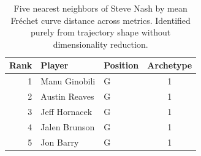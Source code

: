 \begin{table}[htbp]
  \centering\small
  \begin{tabular}{rllc}
    \toprule
    Rank & Player & Position & Archetype \\
    \midrule
    1 & Manu Ginobili & G & 1 \\
    2 & Austin Reaves & G & 1 \\
    3 & Jeff Hornacek & G & 1 \\
    4 & Jalen Brunson & G & 1 \\
    5 & Jon Barry & G & 1 \\
    \bottomrule
  \end{tabular}
  \caption{Five nearest neighbors of Steve Nash by mean Fr\'{e}chet curve distance across metrics. Identified purely from trajectory shape without dimensionality reduction.}
  \label{tab:Steve_Nash_frechet_curve_neighbors}
\end{table}

